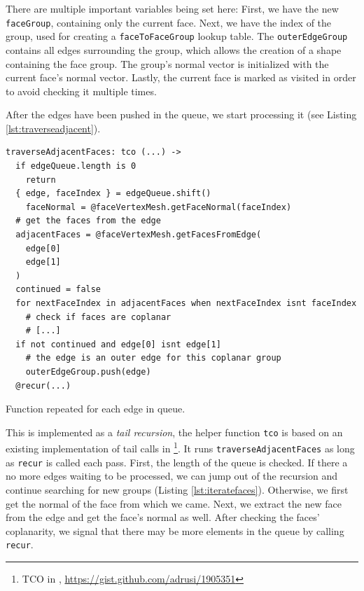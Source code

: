 \documentclass[../ClassicThesis.tex]{subfiles}
\begin{document}
There are multiple important variables being set here: First, we have the new \texttt{faceGroup}, containing only the current face. Next, we have the index of the group, used for creating a \texttt{faceToFaceGroup} lookup table. The \texttt{outerEdgeGroup} contains all edges surrounding the group, which allows the creation of a shape containing the face group. The group's normal vector is initialized with the current face's normal vector. Lastly, the current face is marked as visited in order to avoid checking it multiple times.

After the edges have been pushed in the queue, we start processing it (see Listing \ref{lst:traverseadjacent}).  

\begin{listing}[ht]
\begin{verbatim}
traverseAdjacentFaces: tco (...) ->
  if edgeQueue.length is 0
    return
  { edge, faceIndex } = edgeQueue.shift()
    faceNormal = @faceVertexMesh.getFaceNormal(faceIndex)
  # get the faces from the edge
  adjacentFaces = @faceVertexMesh.getFacesFromEdge(
    edge[0]
    edge[1]
  )
  continued = false
  for nextFaceIndex in adjacentFaces when nextFaceIndex isnt faceIndex
    # check if faces are coplanar
    # [...]
  if not continued and edge[0] isnt edge[1]
    # the edge is an outer edge for this coplanar group
    outerEdgeGroup.push(edge)
  @recur(...)
\end{verbatim}
\caption{Function repeated for each edge in queue.}
\label{lst:traverseadjacent}
\end{listing}


This is implemented as a \emph{tail recursion}, the helper function \texttt{tco} is based on an existing implementation of tail calls in \coffeescript\footnote{TCO in \coffeescript, \url{https://gist.github.com/adrusi/1905351}}. It runs \texttt{traverseAdjacentFaces} as long as \texttt{recur} is called each pass. First, the length of the queue is checked. If there a no more edges waiting to be processed, we can jump out of the recursion and continue searching for new groups (Listing \ref{lst:iteratefaces}). Otherwise, we first get the normal of the face from which we came. Next, we extract the new face from the edge and get the face's normal as well. After checking the faces' coplanarity, we signal that there may be more elements in the queue by calling \texttt{recur}.
\end{document}
